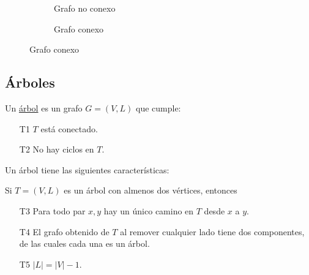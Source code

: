 \begin{figure}
    \begin{subfigure}[b]{0.5\textwidth}
    \centering
        \caption{Grafo no conexo}
    \end{subfigure}
    \hfill
    \begin{subfigure}[b]{0.5\textwidth}
    \centering
        \caption{Grafo conexo}
    \end{subfigure}
\end{figure}

\subsection{Árboles}

\begin{defn}
    Un \ul{árbol} es un grafo $G=(V,L)$ que cumple:
    
    \begin{enumerate}
        \item[T1] $T$ está conectado.
        \item[T2] No hay ciclos en $T$.
    \end{enumerate}
\end{defn}

Un árbol tiene las siguientes características:

\begin{teo}
    Si $T=(V,L)$ es un árbol con almenos dos vértices, entonces
    
    \begin{enumerate}
        \item[T3] Para todo par $x, y$ hay un único camino en $T$ desde $x$ a $y$.
        \item[T4] El grafo obtenido de $T$ al remover cualquier lado tiene dos componentes, de las cuales cada una es un árbol.
        \item[T5] $|L| = |V|-1$.
    \end{enumerate}
\end{teo}


